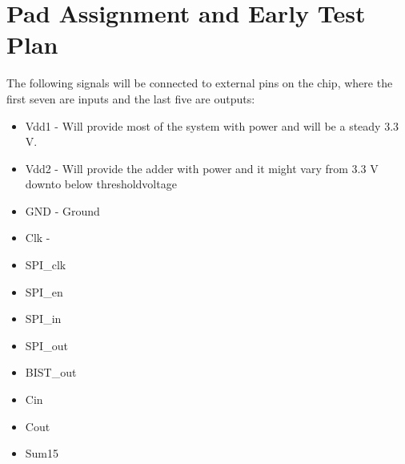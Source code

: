 \section{Pad Assignment and Early Test Plan}
The following signals will be connected to external pins on the chip, where the first seven are inputs and the last five are outputs:
\begin{itemize}
	\item Vdd1 - Will provide most of the system with power and will be a steady 3.3 V.
	\item Vdd2 - Will provide the adder with power and it might vary from 3.3 V downto below thresholdvoltage
	\item GND - Ground
	\item Clk - 
	\item SPI\_clk
	\item SPI\_en
	\item SPI\_in
	\item SPI\_out
	\item BIST\_out
	\item Cin
	\item Cout
	\item Sum15
\end{itemize}
 
